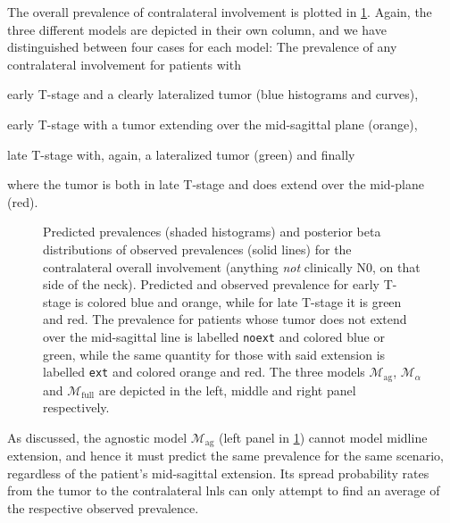 \documentclass[\relativeRoot/main.tex]{subfiles}
\begin{document}
The overall prevalence of contralateral involvement is plotted in \cref{fig:bilateral:model_comp:contra}. Again, the three different models are depicted in their own column, and we have distinguished between four cases for each model: The prevalence of any contralateral involvement for patients with
\begin{enumerate*}[label={(\arabic*)}]
    \item early T-stage and a clearly lateralized tumor (blue histograms and curves),
    \item early T-stage with a tumor extending over the mid-sagittal plane (orange),
    \item late T-stage with, again, a lateralized tumor (green) and finally
    \item where the tumor is both in late T-stage and does extend over the mid-plane (red).
\end{enumerate*}

\begin{figure}
    \def\svgwidth{1.0\textwidth}
    
    \caption[
        Comparison of contralateral prevalences
    ]{
        Predicted prevalences (shaded histograms) and posterior beta distributions of observed prevalences (solid lines) for the contralateral overall involvement (anything \emph{not} clinically N0, on that side of the neck). Predicted and observed prevalence for early T-stage is colored blue and orange, while for late T-stage it is green and red. The prevalence for patients whose tumor does not extend over the mid-sagittal line is labelled \texttt{noext} and colored blue or green, while the same quantity for those with said extension is labelled \texttt{ext} and colored orange and red. The three models $\mathcal{M}_\text{ag}$, $\mathcal{M}_\alpha$ and $\mathcal{M}_\text{full}$ are depicted in the left, middle and right panel respectively.
    }
    \label{fig:bilateral:model_comp:contra}
\end{figure}

As discussed, the agnostic model $\mathcal{M}_\text{ag}$ (left panel in \cref{fig:bilateral:model_comp:contra}) cannot model midline extension, and hence it must predict the same prevalence for the same scenario, regardless of the patient's mid-sagittal extension. Its spread probability rates from the tumor to the contralateral \glspl{lnl} can only attempt to find an average of the respective observed prevalence.
\end{document}
